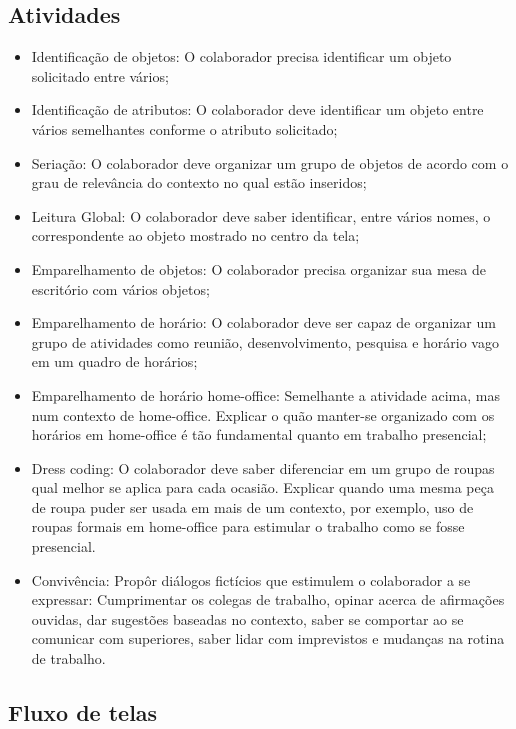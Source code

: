 \documentclass[12pt]{article}
\begin{document}
\subsection{Atividades}
\begin{itemize}
\item Identificação de objetos: O colaborador precisa identificar um objeto solicitado entre vários;
\item Identificação de atributos: O colaborador deve identificar um objeto entre vários semelhantes conforme o atributo solicitado;
\item Seriação: O colaborador deve organizar um grupo de objetos de acordo com o grau de relevância do contexto no qual estão inseridos;
\item Leitura Global: O colaborador deve saber identificar, entre vários nomes, o correspondente ao objeto mostrado no centro da tela;
\item Emparelhamento de objetos: O colaborador precisa organizar sua mesa de escritório com vários objetos;
\item Emparelhamento de horário: O colaborador deve ser capaz de organizar um grupo de atividades como reunião, desenvolvimento, pesquisa e horário vago em um quadro de horários;
\item Emparelhamento de horário home-office: Semelhante a atividade acima, mas num contexto de home-office. Explicar o quão manter-se organizado com os horários em home-office é tão fundamental quanto em trabalho presencial;
\item Dress coding: O colaborador deve saber diferenciar em um grupo de roupas qual melhor se aplica para cada ocasião. Explicar quando uma mesma peça de roupa puder ser usada em mais de um contexto, por exemplo, uso de roupas formais em home-office para estimular o trabalho como se fosse presencial.
\item Convivência: Propôr diálogos fictícios que estimulem o colaborador a se expressar: Cumprimentar os colegas de trabalho, opinar acerca de afirmações ouvidas, dar sugestões baseadas no contexto, saber se comportar ao se comunicar com superiores, saber lidar com imprevistos e mudanças na rotina de trabalho.
\end{itemize}

\subsection{Fluxo de telas}

\end{document}
